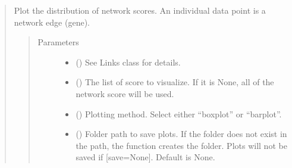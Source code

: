 \documentclass[letterpaper,10pt,english]{sphinxmanual}
\begin{document}
\begin{quote}
\begin{fulllineitems}
\begin{fulllineitems}
\label{\detokenize{modules/celloracle.network_analysis:celloracle.network_analysis.Links.plot_score_discributions}}
Plot the distribution of network scores.
An individual data point is a network edge (gene).
\begin{quote}\begin{description}
\item[{Parameters}] \leavevmode\begin{itemize}
\item {} 
 ({\hyperref[\detokenize{modules/celloracle:celloracle.Links}]{}}) \textendash{} See Links class for details.

\item {} 
 () \textendash{} The list of score to visualize. If it is None, all of the network score will be used.

\item {} 
 () \textendash{} Plotting method. Select either “boxplot” or “barplot”.

\item {} 
 () \textendash{} Folder path to save plots. If the folder does not exist in the path, the function creates the folder.
Plots will not be saved if {[}save=None{]}. Default is None.

\end{itemize}

\end{description}\end{quote}

\end{fulllineitems}



\end{fulllineitems}
\end{quote}
\end{document}
